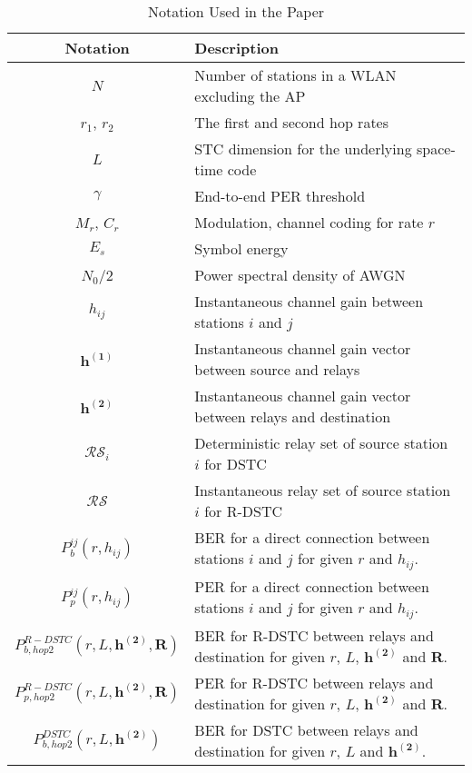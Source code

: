 \documentclass[peerreview,draftcls,onecolumn,12pt,a4paper]{IEEEtran}
\begin{document}
\pagebreak
\begin{table}[h!] \small
\begin{minipage}[b]{1\linewidth}
 \caption{Notation Used in the Paper}
\vspace{.01in} \centering
\begin{tabular}{c||l} \hline
\label{tab:parameters} \textbf{Notation} & \textbf{Description}
\\ \hline \hline $N$ & Number of stations in a WLAN excluding the AP \\ \hline
$r_1$, $r_2$  & The first and second hop rates\\
\hline $L$ & STC dimension for the underlying space-time code \\
\hline
$\gamma$  & End-to-end PER threshold\\
\hline
$M_r$, $C_r$ & Modulation, channel coding for rate $r$\\
\hline $E_s$ & Symbol energy\\ \hline $N_0$/2 & Power spectral
density of AWGN \\ \hline $h_{ij}$ & Instantaneous channel gain
between stations $i$ and $j$
\\  \hline
 ${\mathbf{h^{(1)}}}$ & Instantaneous channel gain vector between  source and relays\\ \hline $\mathbf{h^{(2)}}$ &
 Instantaneous channel gain vector between relays and destination \\
\hline$\mathcal{RS}_i$ & Deterministic relay set of source station
$i$ for DSTC \\ \hline $\mathcal{RS}$ & Instantaneous relay set of
source station $i$ for R-DSTC \\ \hline $P_{b}^{ij}(r,h_{ij})$ &
BER for a direct connection between stations
$i$ and $j$ for given $r$ and $h_{ij}$. \\
$P_{p}^{ij}(r,h_{ij})$ & PER for a direct connection between stations $i$ and $j$ for given $r$ and $h_{ij}$. \\
\hline $P_{b, hop2}^{R-DSTC}(r, L, \mathbf{h^{(2)},R})$ & BER for
R-DSTC between
relays and destination for given $r$, $L$, $\mathbf{h^{(2)}}$ and $\mathbf{R}$. \\
 $P_{p,hop2}^{R-DSTC}(r, L, \mathbf{h^{(2)},R})$ & PER for  R-DSTC  between relays and destination for given $r$, $L$, $\mathbf{h^{(2)}}$ and $\mathbf{R}$. \\
\hline  $P_{b,hop2}^{DSTC}(r,L, \mathbf{h^{(2)}})$ & BER for DSTC
between relays
and destination for given $r$, $L$ and $\mathbf{h^{(2)}}$. \\

\end{tabular}
\end{minipage}
\end{table}
\end{document}
